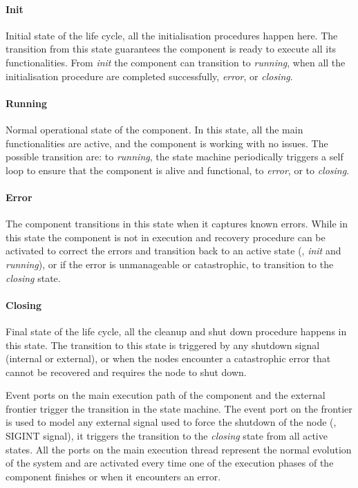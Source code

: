 \paragraph{Init} Initial state of the life cycle, all the initialisation procedures happen here. The transition from this state guarantees the component is ready to execute all its functionalities. From \textit{init} the component can transition to \textit{running}, when all the initialisation procedure are completed successfully, \textit{error}, or \textit{closing}.
\paragraph{Running} Normal operational state of the component. In this state, all the main functionalities are active, and the component is working with no issues. The possible transition are: to \textit{running}, the state machine periodically triggers a self loop to ensure that the component is alive and functional, to \textit{error},  or to \textit{closing}.
\paragraph{Error} The component transitions in this state when it captures known errors. While in this state the component is not in execution and recovery procedure can be activated to correct the errors and transition back to an active state (\ie, \textit{init} and \textit{running}), or if the error is unmanageable or catastrophic, to transition to the \textit{closing} state.
\paragraph{Closing} Final state of the life cycle, all the cleanup and shut down procedure happens in this state. The transition to this state is triggered by any shutdown signal (internal or external), or when the nodes encounter a catastrophic error that cannot be recovered and requires the node to shut down.
\medskip

Event ports on the main execution path of the component and the external frontier trigger the transition in the state machine. The event port on the frontier is used to model any external signal used to force the shutdown of the node (\eg, SIGINT signal), it triggers the transition to the \textit{closing} state from all active states. All the ports on the main execution thread represent the normal evolution of the system and are activated every time one of the execution phases of the component finishes or when it encounters an error.

